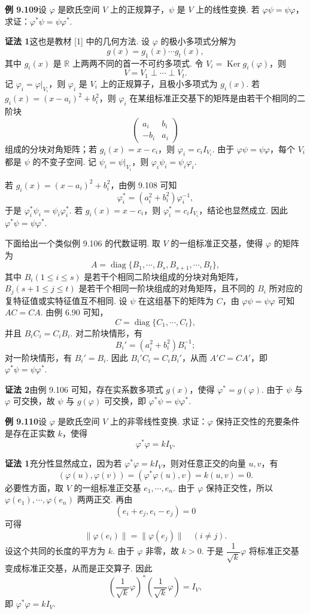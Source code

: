 \documentclass[UTF8, 12pt, fontset=fandol, oneside]{ctexart}
\begin{document}
\noindent\textbf{例 9.109}\quad 设 $\varphi$ 是欧氏空间 $V$ 上的正规算子，$\psi$ 是 $V$ 上的线性变换. 若 $\varphi\psi=\psi\varphi$，求证：$\varphi^*\psi=\psi\varphi^*$.

\noindent\textbf{证法 1}\quad 这也是教材 [1] 中的几何方法. 设 $\varphi$ 的极小多项式分解为
\[
g(x)=g_1(x)\cdots g_t(x),
\]
其中 $g_i(x)$ 是 $\mathbb{R}$ 上两两不同的首一不可约多项式. 令 $V_i=\operatorname{Ker} g_i(\varphi)$，则
\[
V=V_1\perp\cdots\perp V_t.
\]
记 $\varphi_i=\varphi|_{V_i}$，则 $\varphi_i$ 是 $V_i$ 上的正规算子，且极小多项式为 $g_i(x)$. 若 $g_i(x)=(x-a_i)^2+b_i^2$，则 $\varphi_i$ 在某组标准正交基下的矩阵是由若干个相同的二阶块
\[
\begin{pmatrix}
a_i&b_i\\
-b_i&a_i
\end{pmatrix}
\]
组成的分块对角矩阵；若 $g_i(x)=x-c_i$，则 $\varphi_i=c_iI_{V_i}$. 由于 $\varphi\psi=\psi\varphi$，每个 $V_i$ 都是 $\psi$ 的不变子空间. 记 $\psi_i=\psi|_{V_i}$，则 $\varphi_i\psi_i=\psi_i\varphi_i$.

若 $g_i(x)=(x-a_i)^2+b_i^2$，由例 9.108 可知
\[
\varphi_i^*=(a_i^2+b_i^2)\varphi_i^{-1},
\]
于是 $\varphi_i^*\psi_i=\psi_i\varphi_i^*$. 若 $g_i(x)=x-c_i$，则 $\varphi_i^*=c_iI_{V_i}$，结论也显然成立. 因此 $\varphi^*\psi=\psi\varphi^*$.

下面给出一个类似例 9.106 的代数证明. 取 $V$ 的一组标准正交基，使得 $\varphi$ 的矩阵为
\[
A=\operatorname{diag}\{B_1,\cdots,B_s,B_{s+1},\cdots,B_t\},
\]
其中 $B_i(1\le i\le s)$ 是若干个相同二阶块组成的分块对角矩阵，$B_j(s+1\le j\le t)$ 是若干个相同一阶块组成的对角矩阵，且不同的 $B_i$ 所对应的复特征值或实特征值互不相同. 设 $\psi$ 在这组基下的矩阵为 $C$，由 $\varphi\psi=\psi\varphi$ 可知 $AC=CA$. 由例 6.90 可知，
\[
C=\operatorname{diag}\{C_1,\cdots,C_t\},
\]
并且 $B_iC_i=C_iB_i$. 对二阶块情形，有
\[
B_i'=(a_i^2+b_i^2)B_i^{-1};
\]
对一阶块情形，有 $B_i'=B_i$. 因此 $B_i'C_i=C_iB_i'$，从而 $A'C=CA'$，即 $\varphi^*\psi=\psi\varphi^*$.

\noindent\textbf{证法 2}\quad 由例 9.106 可知，存在实系数多项式 $g(x)$，使得 $\varphi^*=g(\varphi)$. 由于 $\psi$ 与 $\varphi$ 可交换，故 $\psi$ 与 $g(\varphi)$ 可交换，即 $\varphi^*\psi=\psi\varphi^*$.

\noindent\textbf{例 9.110}\quad 设 $\varphi$ 是欧氏空间 $V$ 上的非零线性变换. 求证：$\varphi$ 保持正交性的充要条件是存在正实数 $k$，使得
\[
\varphi^*\varphi=kI_V.
\]

\noindent\textbf{证法 1}\quad 充分性显然成立，因为若 $\varphi^*\varphi=kI_V$，则对任意正交的向量 $u,v$，有
\[
(\varphi(u),\varphi(v))=(\varphi^*\varphi(u),v)=k(u,v)=0.
\]
必要性方面，取 $V$ 的一组标准正交基 $e_1,\cdots,e_n$. 由于 $\varphi$ 保持正交性，所以 $\varphi(e_1),\cdots,\varphi(e_n)$ 两两正交. 再由
\[
(e_i+e_j,e_i-e_j)=0
\]
可得
\[
\|\varphi(e_i)\|=\|\varphi(e_j)\|\quad (i\ne j).
\]
设这个共同的长度的平方为 $k$. 由于 $\varphi$ 非零，故 $k>0$. 于是 $\dfrac{1}{\sqrt{k}}\varphi$ 将标准正交基变成标准正交基，从而是正交算子. 因此
\[
\left(\frac{1}{\sqrt{k}}\varphi\right)^*\left(\frac{1}{\sqrt{k}}\varphi\right)=I_V,
\]
即 $\varphi^*\varphi=kI_V$.
\end{document}
